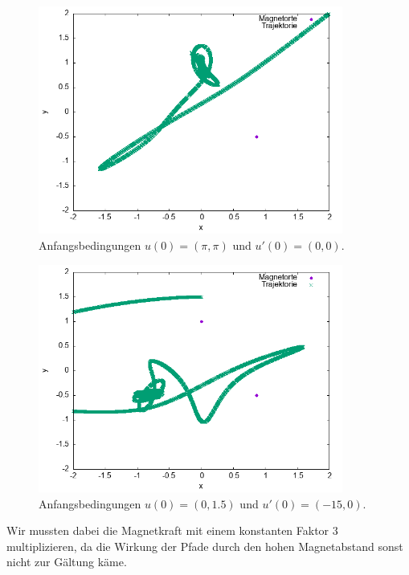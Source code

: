 \documentclass[
    oneside,
    ngerman,
    footinclude=false,
    captions=tableheading,
    DIV=12
]{scrartcl}
\begin{document}
    \begin{figure}[H]
        \centering
        \includegraphics[width=10cm]{../Simulation/img/trcs/velverl3-314-314-0-0.png}
        \caption{Anfangsbedingungen $u(0) = (\pi,\pi)$ und $u'(0) = (0,0)$.}
    \end{figure}

    \begin{figure}[H]
        \centering
        \includegraphics[width=10cm]{../Simulation/img/trcs/velverl3-0-1.5--15-0.png}
        \caption{Anfangsbedingungen $u(0) = (0,1.5)$ und $u'(0) = (-15,0)$.}
    \end{figure}

    Wir mussten dabei die Magnetkraft mit einem konstanten Faktor $3$ multiplizieren, da die Wirkung der Pfade durch den hohen Magnetabstand sonst nicht zur Gältung käme. 
\end{document}
